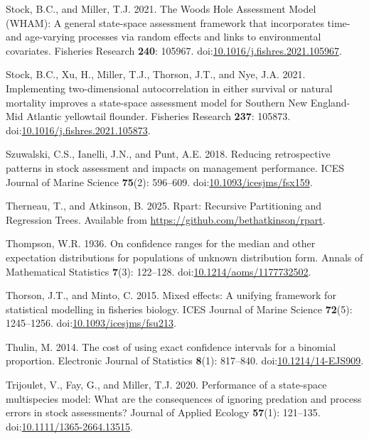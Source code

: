 \documentclass[
  12pt,
]{article}
\newlength{\cslhangindent}
\newenvironment{CSLReferences}[2] %
 {\begin{list}{}{%
  \setlength{\itemindent}{0pt}
  \setlength{\leftmargin}{0pt}
  \setlength{\parsep}{0pt}
  \ifodd #1
   \setlength{\leftmargin}{\cslhangindent}
   \setlength{\itemindent}{-1\cslhangindent}
  \fi
  \setlength{\itemsep}{#2\baselineskip}}}
 {\end{list}}
\begin{document}
\begin{CSLReferences}{1}{0}
Stock, B.C., and Miller, T.J. 2021. The {W}oods {H}ole {A}ssessment
{M}odel ({WHAM}): {A} general state-space assessment framework that
incorporates time- and age-varying processes via random effects and
links to environmental covariates. Fisheries Research \textbf{240}:
105967.
doi:\href{https://doi.org/10.1016/j.fishres.2021.105967}{10.1016/j.fishres.2021.105967}.

Stock, B.C., Xu, H., Miller, T.J., Thorson, J.T., and Nye, J.A. 2021.
{Implementing two-dimensional autocorrelation in either survival or
natural mortality improves a state-space assessment model for Southern
{N}ew {E}ngland-Mid {A}tlantic yellowtail flounder}. Fisheries Research
\textbf{237}: 105873.
doi:\href{https://doi.org/10.1016/j.fishres.2021.105873}{10.1016/j.fishres.2021.105873}.

Szuwalski, C.S., Ianelli, J.N., and Punt, A.E. 2018. Reducing
retrospective patterns in stock assessment and impacts on management
performance. ICES Journal of Marine Science \textbf{75}(2): 596--609.
doi:\href{https://doi.org/10.1093/icesjms/fsx159}{10.1093/icesjms/fsx159}.

Therneau, T., and Atkinson, B. 2025. Rpart: {R}ecursive {P}artitioning
and {R}egression {T}rees. Available from
\url{https://github.com/bethatkinson/rpart}.

Thompson, W.R. 1936. On confidence ranges for the median and other
expectation distributions for populations of unknown distribution form.
Annals of Mathematical Statistics \textbf{7}(3): 122--128.
doi:\href{https://doi.org/10.1214/aoms/1177732502}{10.1214/aoms/1177732502}.

Thorson, J.T., and Minto, C. 2015. Mixed effects: A unifying framework
for statistical modelling in fisheries biology. ICES Journal of Marine
Science \textbf{72}(5): 1245--1256.
doi:\href{https://doi.org/10.1093/icesjms/fsu213}{10.1093/icesjms/fsu213}.

Thulin, M. 2014. {The cost of using exact confidence intervals for a
binomial proportion}. Electronic Journal of Statistics \textbf{8}(1):
817--840.
doi:\href{https://doi.org/10.1214/14-EJS909}{10.1214/14-EJS909}.

Trijoulet, V., Fay, G., and Miller, T.J. 2020. Performance of a
state-space multispecies model: What are the consequences of ignoring
predation and process errors in stock assessments? Journal of Applied
Ecology \textbf{57}(1): 121--135.
doi:\href{https://doi.org/10.1111/1365-2664.13515}{10.1111/1365-2664.13515}.


\end{CSLReferences}
\end{document}
